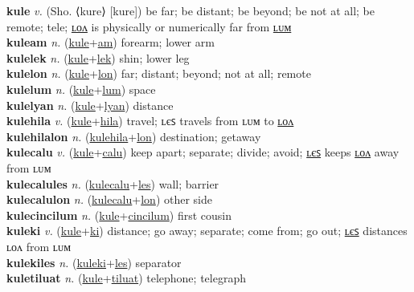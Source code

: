 \textbf{kule} \textit{v.} (Sho. ⟨kure⟩ [kure])
be far; be distant; be beyond; be not at all; be remote; tele; \hyperref[kulelon]{ʟᴏᴧ} is physically or numerically far from \hyperref[kulelum]{ʟᴜᴍ} \label{kule} \\
\textbf{kuleam} \textit{n.} (\hyperref[kule]{kule}+\hyperref[am]{am})
forearm; lower arm \label{kuleam} \\
\textbf{kulelek} \textit{n.} (\hyperref[kule]{kule}+\hyperref[lek]{lek})
shin; lower leg \label{kulelek} \\
\textbf{kulelon} \textit{n.} (\hyperref[kule]{kule}+\hyperref[lon]{lon})
far; distant; beyond; not at all; remote \label{kulelon} \\
\textbf{kulelum} \textit{n.} (\hyperref[kule]{kule}+\hyperref[lum]{lum})
space \label{kulelum} \\
\textbf{kulelyan} \textit{n.} (\hyperref[kule]{kule}+\hyperref[lyan]{lyan})
distance \label{kulelyan} \\
\textbf{kulehila} \textit{v.} (\hyperref[kule]{kule}+\hyperref[hila]{hila})
travel; ʟєꜱ travels from ʟᴜᴍ to \hyperref[kulehilalon]{ʟᴏᴧ} \label{kulehila} \\
\textbf{kulehilalon} \textit{n.} (\hyperref[kulehila]{kulehila}+\hyperref[lon]{lon})
destination; getaway \label{kulehilalon} \\
\textbf{kulecalu} \textit{v.} (\hyperref[kule]{kule}+\hyperref[calu]{calu})
keep apart; separate; divide; avoid; \hyperref[kulecalules]{ʟєꜱ} keeps \hyperref[kulecalulon]{ʟᴏᴧ} away from ʟᴜᴍ \label{kulecalu} \\
\textbf{kulecalules} \textit{n.} (\hyperref[kulecalu]{kulecalu}+\hyperref[les]{les})
wall; barrier \label{kulecalules} \\
\textbf{kulecalulon} \textit{n.} (\hyperref[kulecalu]{kulecalu}+\hyperref[lon]{lon})
other side \label{kulecalulon} \\
\textbf{kulecincilum} \textit{n.} (\hyperref[kule]{kule}+\hyperref[cincilum]{cincilum})
first cousin \label{kulecincilum} \\
\textbf{kuleki} \textit{v.} (\hyperref[kule]{kule}+\hyperref[ki]{ki})
distance; go away; separate; come from; go out; \hyperref[kulekiles]{ʟєꜱ} distances ʟᴏᴧ from ʟᴜᴍ \label{kuleki} \\
\textbf{kulekiles} \textit{n.} (\hyperref[kuleki]{kuleki}+\hyperref[les]{les})
separator \label{kulekiles} \\
\textbf{kuletiluat} \textit{n.} (\hyperref[kule]{kule}+\hyperref[tiluat]{tiluat})
telephone; telegraph \label{kuletiluat} \\
